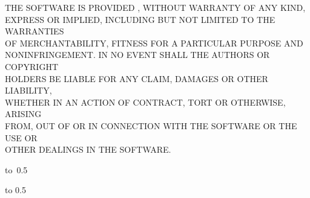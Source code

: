 {
\footnotesize
\vspace{3mm}
\noindent
THE SOFTWARE IS PROVIDED , WITHOUT WARRANTY OF ANY KIND, \\
EXPRESS OR IMPLIED, INCLUDING BUT NOT LIMITED TO THE WARRANTIES \\
OF MERCHANTABILITY, FITNESS FOR A PARTICULAR PURPOSE AND \\
NONINFRINGEMENT. IN NO EVENT SHALL THE AUTHORS OR COPYRIGHT \\
HOLDERS BE LIABLE FOR ANY CLAIM, DAMAGES OR OTHER LIABILITY, \\
WHETHER IN AN ACTION OF CONTRACT, TORT OR OTHERWISE, ARISING \\
FROM, OUT OF OR IN CONNECTION WITH THE SOFTWARE OR THE USE OR \\
OTHER DEALINGS IN THE SOFTWARE.
}

\vspace{15mm}

\hbox{\hbox to 0.5}

\vspace{20mm}
\newpage


\openright

\Podakovanie

\newpage


\openright

\vbox to 0.5

\newpage

\openright
\pagestyle{plain}
\setcounter{page}{1}

